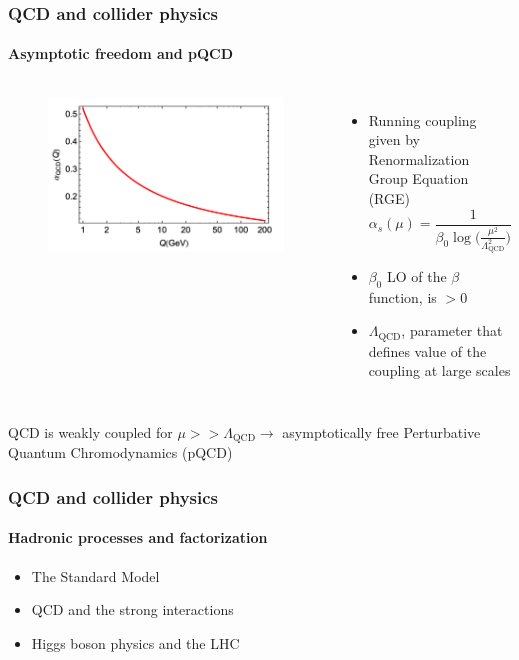 \documentclass[aspectratio=43]{beamer}
\begin{document}
\begin{frame}

	\frametitle{QCD and collider physics}
	\framesubtitle{Asymptotic freedom and pQCD}
	
	\begin{columns}	
		
		
		\begin{figure}
			\includegraphics[width = 5 cm]{plots/part1/qcd_coupling.png}
		\end{figure}
		
		
		\begin{itemize}
			\item \footnotesize Running coupling given by Renormalization Group Equation (RGE)
			\begin{equation}
			\alpha_{s}(\mu) = \frac{1}{\beta_{0} \log\big( \frac{\mu^{2}}{\Lambda_{\textrm{QCD}}^{2}}\big)} \nonumber
			\end{equation}
			\item \footnotesize $\beta_{0}$ LO of the $\beta$ function, is $ > 0$
			\item \footnotesize $\Lambda_{\textrm{QCD}}$, parameter that defines value of the coupling at large scales
		\end{itemize}
		
	\end{columns}
	
	\vspace{1cm}
	\center QCD is weakly coupled for $\mu >> \Lambda_{\textrm{QCD}} \longrightarrow$ asymptotically free
	\center \color{red} Perturbative Quantum Chromodynamics (pQCD)

\end{frame}

\begin{frame}
	
	\frametitle{QCD and collider physics}
	\framesubtitle{Hadronic processes and factorization}
	
	\begin{itemize}
		\item \footnotesize The Standard Model
		\item \footnotesize QCD and the strong interactions
		\item \footnotesize Higgs boson physics and the LHC
	\end{itemize}

\end{frame}
\end{document}
